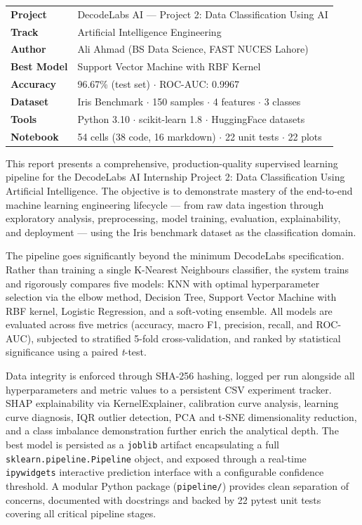 \documentclass[12pt, a4paper]{report}
\newcommand{\code}[1]{\texttt{\small\textcolor{primary}{#1}}}
\begin{document}
\begin{keybox}
\begin{tabular}{@{}L{4cm}L{9cm}@{}}
  \textbf{Project}    & DecodeLabs AI — Project 2: Data Classification Using AI \\
  \textbf{Track}      & Artificial Intelligence Engineering \\
  \textbf{Author}     & Ali Ahmad (BS Data Science, FAST NUCES Lahore) \\
  \textbf{Best Model} & Support Vector Machine with RBF Kernel \\
  \textbf{Accuracy}   & 96.67\% (test set) $\cdot$ ROC-AUC: 0.9967 \\
  \textbf{Dataset}    & Iris Benchmark $\cdot$ 150 samples $\cdot$ 4 features $\cdot$ 3 classes \\
  \textbf{Tools}      & Python 3.10 $\cdot$ scikit-learn 1.8 $\cdot$ HuggingFace datasets \\
  \textbf{Notebook}   & 54 cells (38 code, 16 markdown) $\cdot$ 22 unit tests $\cdot$ 22 plots \\
\end{tabular}
\end{keybox}

\vspace{12pt}

This report presents a comprehensive, production-quality supervised learning pipeline for the
DecodeLabs AI Internship Project 2: Data Classification Using Artificial Intelligence. The
objective is to demonstrate mastery of the end-to-end machine learning engineering
lifecycle — from raw data ingestion through exploratory analysis, preprocessing, model
training, evaluation, explainability, and deployment — using the Iris benchmark dataset as
the classification domain.

The pipeline goes significantly beyond the minimum DecodeLabs specification. Rather than
training a single K-Nearest Neighbours classifier, the system trains and rigorously
compares five models: KNN with optimal hyperparameter selection via the elbow method,
Decision Tree, Support Vector Machine with RBF kernel, Logistic Regression, and a
soft-voting ensemble. All models are evaluated across five metrics (accuracy, macro F1,
precision, recall, and ROC-AUC), subjected to stratified 5-fold cross-validation, and
ranked by statistical significance using a paired \textit{t}-test.

Data integrity is enforced through SHA-256 hashing, logged per run alongside all
hyperparameters and metric values to a persistent CSV experiment tracker. SHAP
explainability via KernelExplainer, calibration curve analysis, learning curve diagnosis,
IQR outlier detection, PCA and t-SNE dimensionality reduction, and a class imbalance
demonstration further enrich the analytical depth. The best model is persisted as a
\code{joblib} artifact encapsulating a full \code{sklearn.pipeline.Pipeline} object, and
exposed through a real-time \code{ipywidgets} interactive prediction interface with a
configurable confidence threshold. A modular Python package (\code{pipeline/}) provides
clean separation of concerns, documented with docstrings and backed by 22 pytest unit
tests covering all critical pipeline stages.
\end{document}
